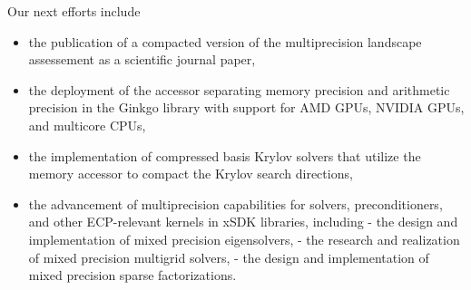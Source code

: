 Our next efforts include 
\begin{itemize}
    \item the publication of a compacted version of the multiprecision landscape assessement as a scientific journal paper,
    \item the deployment of the accessor separating memory precision and arithmetic precision in the Ginkgo library with support for AMD GPUs, NVIDIA GPUs, and multicore CPUs,  
    \item the implementation of compressed basis Krylov solvers that utilize the memory accessor to compact the Krylov search directions,
    \item the advancement of multiprecision capabilities for solvers, preconditioners, and other ECP-relevant kernels in xSDK libraries, including
    \subitem - the design and implementation of mixed precision eigensolvers,
    \subitem - the research and realization of mixed precision multigrid solvers,
    \subitem - the design and implementation of mixed precision sparse factorizations.
\end{itemize}

